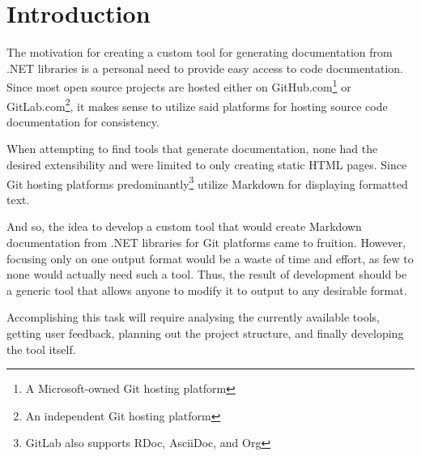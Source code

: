 \chapter*{Introduction}

The motivation for creating a custom tool for generating documentation from .NET libraries is a personal need to provide easy access to code documentation. Since most open source projects are hosted either on GitHub.com\footnote{A Microsoft-owned Git hosting platform} or GitLab.com\footnote{An independent Git hosting platform}, it makes sense to utilize said platforms for hosting source code documentation for consistency.

When attempting to find tools that generate documentation, none had the desired extensibility and were limited to only creating static HTML pages. Since Git hosting platforms predominantly\footnote{GitLab also supports RDoc, AsciiDoc, and Org} utilize Markdown for displaying formatted text.

And so, the idea to develop a custom tool that would create Markdown documentation from .NET libraries for Git platforms came to fruition. However, focusing only on one output format would be a waste of time and effort, as few to none would actually need such a tool. Thus, the result of development should be a generic tool that allows anyone to modify it to output to any desirable format.

Accomplishing this task will require analysing the currently available tools, getting user feedback, planning out the project structure, and finally developing the tool itself.
